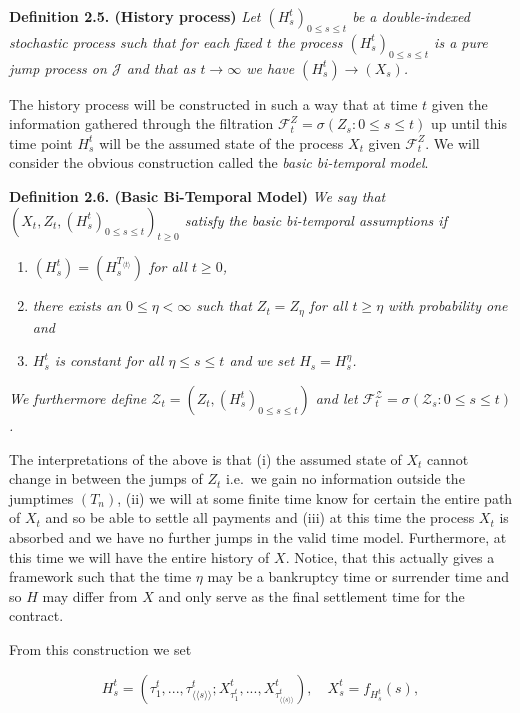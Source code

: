 \documentclass[a4paper,10pt,openany]{book}
\providecommand{\tightlist}{%
 \setlength{\itemsep}{0pt}\setlength{\parskip}{0pt}}
\begin{document}
\textbf{Definition 2.5. (History process)} \emph{Let \((H^t_s)_{0\le s\le t}\) be a double-indexed stochastic process such that for each fixed \(t\) the process \((H^t_s)_{0\le s\le t}\) is a pure jump process on \(\mathcal J\) and that as \(t \to \infty\) we have \((H^t_s)\to (X_s)\).}

The history process will be constructed in such a way that at time \(t\) given the information gathered through the filtration \(\mathcal F^Z_t=\sigma (Z_s : 0\le s\le t)\) up until this time point \(H_s^t\) will be the assumed state of the process \(X_t\) given \(\mathcal F^Z_t\). We will consider the obvious construction called the \emph{basic bi-temporal model}.

\textbf{Definition 2.6. (Basic Bi-Temporal Model)} \emph{We say that \((X_t,Z_t,(H^t_s)_{0\le s\le t})_{t\ge 0}\) satisfy the basic bi-temporal assumptions if}

\begin{enumerate}
\def\labelenumi{(\roman{enumi})}
\tightlist
\item
  \emph{\((H^t_s)=(H^{T_{\langle t\rangle}}_s)\) for all \(t\ge 0\),}
\item
  \emph{there exists an \(0\le \eta <\infty\) such that \(Z_t=Z_\eta\) for all \(t\ge \eta\) with probability one and}
\item
  \emph{\(H^t_s\) is constant for all \(\eta \le s\le t\) and we set \(H_s=H^\eta_s\).}
\end{enumerate}

\emph{We furthermore define \(\mathcal Z_t=(Z_t,(H^t_s)_{0\le s\le t})\) and let \(\mathcal F^{\mathcal Z}_t=\sigma(\mathcal Z_s : 0\le s\le t)\).}

The interpretations of the above is that (i) the assumed state of \(X_t\) cannot change in between the jumps of \(Z_t\) i.e.~we gain no information outside the jumptimes \((T_n)\), (ii) we will at some finite time know for certain the entire path of \(X_t\) and so be able to settle all payments and (iii) at this time the process \(X_t\) is absorbed and we have no further jumps in the valid time model. Furthermore, at this time we will have the entire history of \(X\). Notice, that this actually gives a framework such that the time \(\eta\) may be a bankruptcy time or surrender time and so \(H\) may differ from \(X\) and only serve as the final settlement time for the contract.

From this construction we set

\[
H_s^t=\left( \tau_1^t,..., \tau_{\langle\langle s\rangle \rangle }^t; X_{\tau_1^t}^t,..., X_{\tau_{\langle\langle s\rangle \rangle }^t}^t\right),\quad X_s^t=f_{H^t_s}(s),
\]
\end{document}
